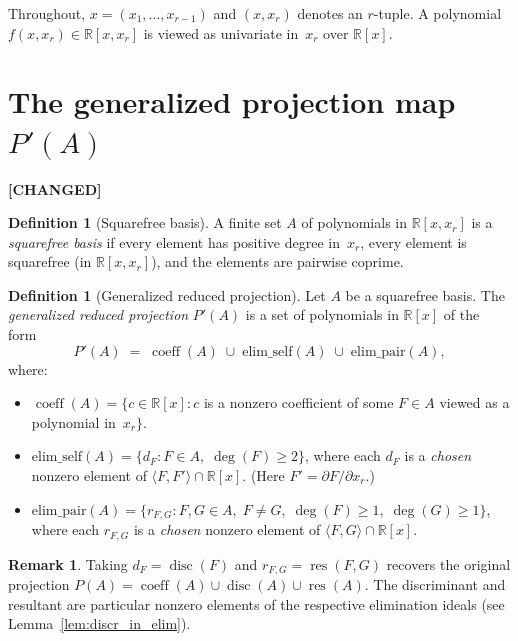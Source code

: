 \documentclass[11pt]{article}
\theoremstyle{plain}
\theoremstyle{definition}
\newtheorem{definition}[theorem]{Definition}
\newtheorem*{remark}{Remark}
\newcommand{\R}{\mathbb{R}}
\DeclareMathOperator{\res}{res}
\DeclareMathOperator{\disc}{disc}
\DeclareMathOperator{\coeff}{coeff}
\begin{document}
Throughout, $x = (x_1, \ldots, x_{r-1})$ and $(x, x_r)$ denotes an
$r$-tuple.  A polynomial $f(x, x_r) \in \R[x, x_r]$ is viewed as
univariate in~$x_r$ over $\R[x]$.

\section{The generalized projection map \texorpdfstring{$P'(A)$}{P'(A)}}
\label{sec:projection_map}

\textbf{[CHANGED]}

\begin{definition}[Squarefree basis]
A finite set $A$ of polynomials in $\R[x, x_r]$ is a \emph{squarefree
basis} if every element has positive degree in~$x_r$, every element is
squarefree (in $\R[x, x_r]$), and the elements are pairwise coprime.
\end{definition}

\begin{definition}[Generalized reduced projection]
\label{def:gen_projection}
Let $A$ be a squarefree basis.  The \emph{generalized reduced projection}
$P'(A)$ is a set of polynomials in $\R[x]$ of the form
\[
  P'(A) \;=\; \coeff(A) \;\cup\; \mathrm{elim\_self}(A)
              \;\cup\; \mathrm{elim\_pair}(A),
\]
where:
\begin{itemize}
\item $\coeff(A) = \{ c \in \R[x] : c$ is a nonzero coefficient of some
  $F \in A$ viewed as a polynomial in~$x_r \}$.
\item $\mathrm{elim\_self}(A) = \{ d_F : F \in A,\; \deg(F) \ge 2 \}$,
  where each $d_F$ is a \emph{chosen} nonzero element of
  $\langle F, F' \rangle \cap \R[x]$.
  (Here $F' = \partial F / \partial x_r$.)
\item $\mathrm{elim\_pair}(A) = \{ r_{F,G} : F, G \in A,\; F \ne G,\;
  \deg(F) \ge 1,\; \deg(G) \ge 1 \}$, where each $r_{F,G}$ is a
  \emph{chosen} nonzero element of $\langle F, G \rangle \cap \R[x]$.
\end{itemize}
\end{definition}

\begin{remark}
Taking $d_F = \disc(F)$ and $r_{F,G} = \res(F, G)$ recovers the
original projection $P(A) = \coeff(A) \cup \disc(A) \cup \res(A)$.
The discriminant and resultant are particular nonzero elements of the
respective elimination ideals (see Lemma~\ref{lem:discr_in_elim}).
\end{remark}
\end{document}

